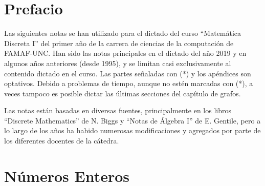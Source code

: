 \documentclass[11pt,spanish,makeidx]{amsbook}
\theoremstyle{definition}
\theoremstyle{remark}
\begin{document}
	\tableofcontents 




	\chapter*{Prefacio} 
	Las siguientes notas se han utilizado para el dictado del curso  “Matemática Discreta I” del primer año de la carrera de ciencias de la computación de FAMAF-UNC. Han sido las notas principales en el dictado del año 2019 y en algunos años anteriores (desde 1995), y se limitan casi exclusivamente al contenido dictado en el curso. Las partes señaladas con (*) y los apéndices son optativos. Debido a problemas de tiempo, aunque no estén marcadas con (*), a veces tampoco es posible dictar las últimas secciones del capítulo de grafos. 

	Las notas están basadas en diversas fuentes, principalmente en los libros “Discrete Mathematics” de N. Biggs y “Notas de Álgebra I” de E. Gentile, pero a lo largo de los años ha habido numerosas modificaciones y  agregados por parte de los diferentes docentes de la cátedra. 

\chapter[Números Enteros]{Números Enteros}
\end{document}
